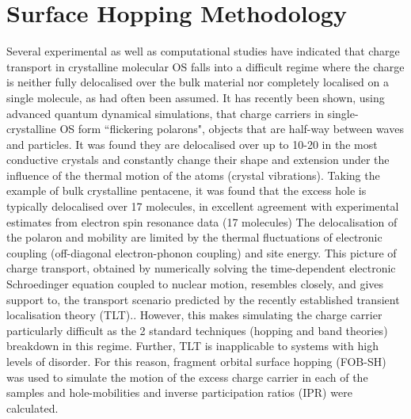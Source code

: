 \section{Surface Hopping Methodology}
Several experimental as well as computational studies have indicated that charge transport in crystalline molecular OS falls into a difficult regime where the charge is neither fully delocalised over the bulk material nor completely localised on a single molecule, as had often been assumed.\cite{Vehoff2010,Deng2004,Kwiatkowski2009,Athanasopoulos2007,Vehoff2010_2,Kordt2016,Zhang2019} It has recently been shown, using advanced quantum dynamical simulations, that charge carriers in single-crystalline OS form ``flickering polarons", objects that are half-way between waves and particles\cite{FlickPolarons,Giannini2019,Ziogos20}. It was found they are delocalised over up to 10-20 in the most conductive crystals and constantly change their shape and extension under the influence of the thermal motion of the atoms (crystal vibrations).  Taking the example of bulk crystalline pentacene, it was found that the excess hole is typically delocalised over 17 molecules, in excellent agreement with experimental estimates from electron spin resonance data (17 molecules) The delocalisation of the polaron and mobility are limited by the thermal fluctuations of electronic coupling (off-diagonal electron-phonon coupling) and site energy. This picture of charge transport, obtained by numerically solving the time-dependent electronic Schroedinger equation coupled to nuclear motion, resembles closely, and gives support to, the transport scenario predicted by the recently established transient localisation theory (TLT).\cite{Nematiaram2019,PhysRevB.83.081202}. However, this makes simulating the charge carrier particularly difficult as the 2 standard techniques (hopping and band theories) breakdown in this regime. Further, TLT is inapplicable to systems with high levels of disorder. For this reason, fragment orbital surface hopping (FOB-SH) was used to simulate the motion of the excess charge carrier in each of the samples and hole-mobilities and inverse participation ratios (IPR) were calculated.

